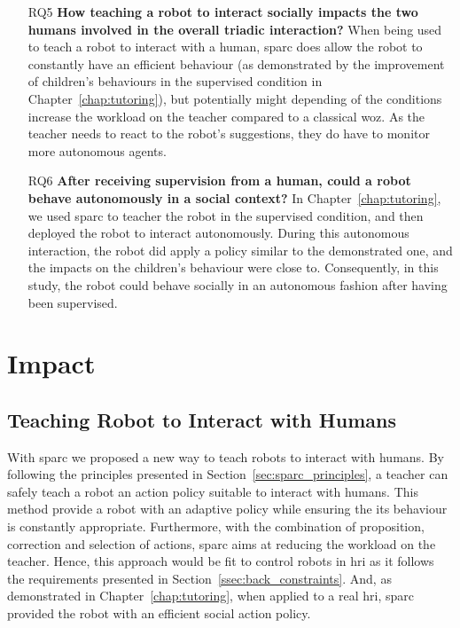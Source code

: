 \begin{itemize}
\item [RQ5] \textbf{How teaching a robot to interact socially impacts the two humans involved in the overall triadic interaction?}
When being used to teach a robot to interact with a human, \gls{sparc} does allow the robot to constantly have an efficient behaviour (as demonstrated by the improvement of children's behaviours in the supervised condition in Chapter~\ref{chap:tutoring}), but potentially might depending of the conditions increase the workload on the teacher compared to a classical \gls{woz}. As the teacher needs to react to the robot's suggestions, they do have to monitor more autonomous agents.

\item [RQ6] \textbf{After receiving supervision from a human, could a robot behave autonomously in a social context?}
In Chapter~\ref{chap:tutoring}, we used \gls{sparc} to teacher the robot in the supervised condition, and then deployed the robot to interact autonomously. During this autonomous interaction, the robot did apply a policy similar to the demonstrated one, and the impacts on the children's behaviour were close to. Consequently, in this study, the robot could behave socially in an autonomous fashion after having been supervised.

\end{itemize}
\section{Impact} \label{sec:disc_impact}

\subsection{Teaching Robot to Interact with Humans}

With \gls{sparc} we proposed a new way to teach robots to interact with humans. By following the principles presented in Section~\ref{sec:sparc_principles}, a teacher can safely teach a robot an action policy suitable to interact with humans. This method provide a robot with an adaptive policy while ensuring the its behaviour is constantly appropriate. Furthermore, with the combination of proposition, correction and selection of actions, \gls{sparc} aims at reducing the workload on the teacher. Hence, this approach would be fit to control robots in \gls{hri} as it follows the requirements presented in Section~\ref{ssec:back_constraints}. And, as demonstrated in Chapter~\ref{chap:tutoring}, when applied to a real \gls{hri}, \gls{sparc} provided the robot with an efficient social action policy. 

